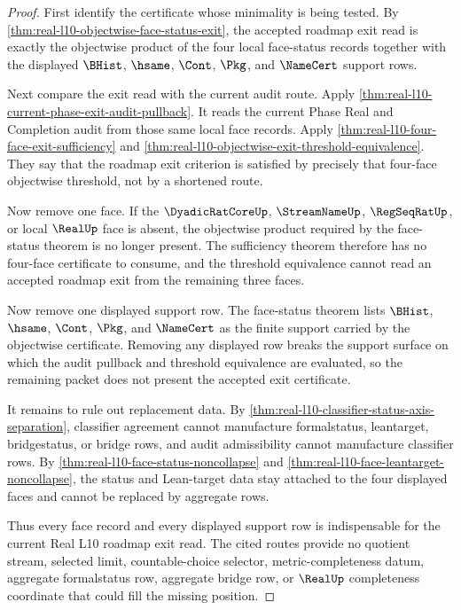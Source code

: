 \begin{proof}
First identify the certificate whose minimality is being tested. By \autoref{thm:real-l10-objectwise-face-status-exit}, the accepted roadmap exit read is exactly the objectwise product of the four local face-status records together with the displayed $\BHist$, $\hsame$, $\Cont$, $\Pkg$, and $\NameCert$ support rows.

Next compare the exit read with the current audit route. Apply \autoref{thm:real-l10-current-phase-exit-audit-pullback}. It reads the current Phase Real and Completion audit from those same local face records. Apply \autoref{thm:real-l10-four-face-exit-sufficiency} and \autoref{thm:real-l10-objectwise-exit-threshold-equivalence}. They say that the roadmap exit criterion is satisfied by precisely that four-face objectwise threshold, not by a shortened route.

Now remove one face. If the $\DyadicRatCoreUp$, $\StreamNameUp$, $\RegSeqRatUp$, or local $\RealUp$ face is absent, the objectwise product required by the face-status theorem is no longer present. The sufficiency theorem therefore has no four-face certificate to consume, and the threshold equivalence cannot read an accepted roadmap exit from the remaining three faces.

Now remove one displayed support row. The face-status theorem lists $\BHist$, $\hsame$, $\Cont$, $\Pkg$, and $\NameCert$ as the finite support carried by the objectwise certificate. Removing any displayed row breaks the support surface on which the audit pullback and threshold equivalence are evaluated, so the remaining packet does not present the accepted exit certificate.

It remains to rule out replacement data. By \autoref{thm:real-l10-classifier-status-axis-separation}, classifier agreement cannot manufacture formalstatus, leantarget, bridgestatus, or bridge rows, and audit admissibility cannot manufacture classifier rows. By \autoref{thm:real-l10-face-status-noncollapse} and \autoref{thm:real-l10-face-leantarget-noncollapse}, the status and Lean-target data stay attached to the four displayed faces and cannot be replaced by aggregate rows.

Thus every face record and every displayed support row is indispensable for the current Real L10 roadmap exit read. The cited routes provide no quotient stream, selected limit, countable-choice selector, metric-completeness datum, aggregate formalstatus row, aggregate bridge row, or $\RealUp$ completeness coordinate that could fill the missing position.
\end{proof}

